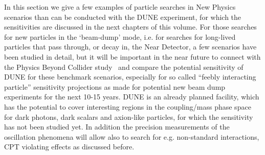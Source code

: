 In this section we give a few examples of particle searches in New Physics scenarios than can be conducted with the DUNE experiment, for which the sensitivities are discussed in the next chapters of this volume. For those searches
for new particles in the `beam-dump' mode, i.e. for  
searches for long-lived particles that  pass through, or decay in, the Near Detector, a few scenarios have been
studied in detail, but it will be important in the near future to connect with the
Physics Beyond Collider study~\cite{Beacham:2019nyx} and compare the potential sensitivity of DUNE for these
benchmark scenarios,
especially for so called ``feebly interacting  particle'' sensitivity projections as made for 
potential new beam dump experiments for the next 10-15 years. DUNE is an already planned facility, which has the potential to cover interesting regions in the coupling/mass phase space
for dark photons, dark scalars and axion-like particles, for which the sensitivity has not been studied yet.
In addition the precision measurements of the oscillation phenomena will allow also to search for e.g. non-standard interactions, CPT violating effects as discussed before.

 
